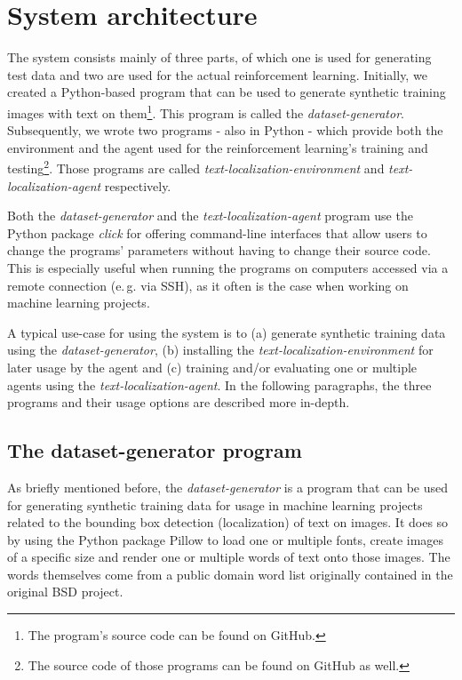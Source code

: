 \section{System architecture}

The system consists mainly of three parts, of which one is used for generating test data and two are used for the actual reinforcement learning.
Initially, we created a Python-based program that can be used to generate synthetic training images with text on them\footnote{The program's source code can be found on GitHub.\cite{GitHubDatasetGenerator}}. 
This program is called the \textit{dataset-generator}.
Subsequently, we wrote two programs - also in Python - which provide both the environment and the agent used for the reinforcement learning's training and testing\footnote{The source code of those programs can be found on GitHub as well.\cite{GitHubTextLocalizationEnvironment}\cite{GitHubTextLocalizationAgent}}. 
Those programs are called \textit{text-localization-environment} and \textit{text-localization-agent} respectively. 

Both the \textit{dataset-generator} and the \textit{text-localization-agent} program use the Python package \textit{click}\cite{PythonPackageClick} for offering command-line interfaces that allow users to change the programs' parameters without having to change their source code.
This is especially useful when running the programs on computers accessed via a remote connection (e.\,g. via SSH), as it often is the case when working on machine learning projects.

A typical use-case for using the system is to (a) generate synthetic training data using the \textit{dataset-generator}, (b) installing the \textit{text-localization-environment} for later usage by the agent and (c) training and/or evaluating one or multiple agents using the \textit{text-localization-agent}. 
In the following paragraphs, the three programs and their usage options are described more in-depth.

\subsection{The dataset-generator program}\label{sec:dataset-generator}

As briefly mentioned before, the \textit{dataset-generator} is a program that can be used for generating synthetic training data for usage in machine learning projects related to the bounding box detection (localization) of text on images. 
It does so by using the Python package Pillow\cite{PythonPackagePillow} to load one or multiple fonts, create images of a specific size and render one or multiple words of text onto those images.
The words themselves come from a public domain word list originally contained in the original BSD project.\cite{BSDWordlist}

